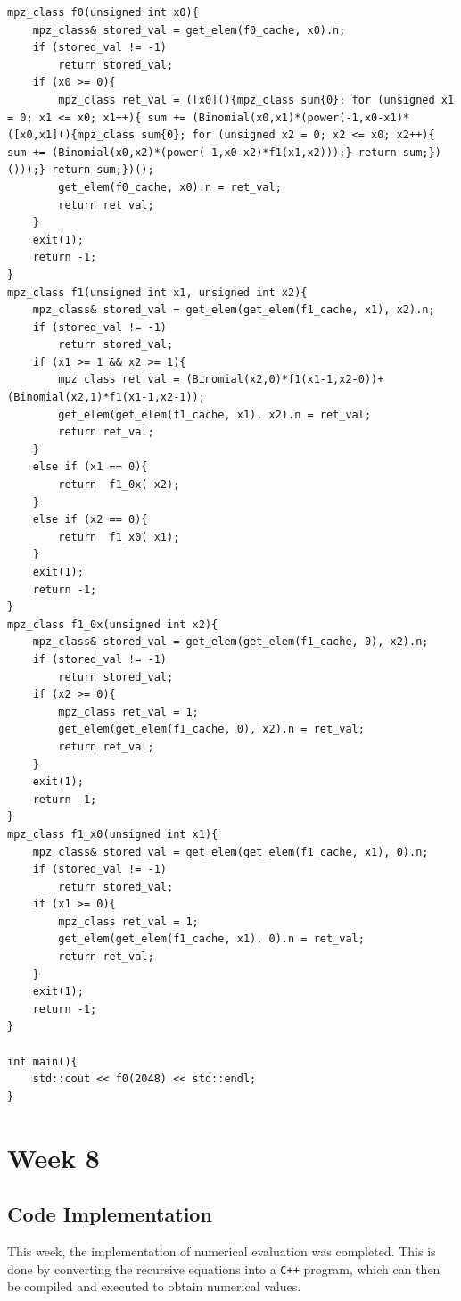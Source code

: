 \documentclass[12pt]{report}
\begin{document}
\begin{verbatim}
mpz_class f0(unsigned int x0){
	mpz_class& stored_val = get_elem(f0_cache, x0).n;
	if (stored_val != -1)
		return stored_val;
	if (x0 >= 0){
		mpz_class ret_val = ([x0](){mpz_class sum{0}; for (unsigned x1 = 0; x1 <= x0; x1++){ sum += (Binomial(x0,x1)*(power(-1,x0-x1)*([x0,x1](){mpz_class sum{0}; for (unsigned x2 = 0; x2 <= x0; x2++){ sum += (Binomial(x0,x2)*(power(-1,x0-x2)*f1(x1,x2)));} return sum;})()));} return sum;})();
		get_elem(f0_cache, x0).n = ret_val;
		return ret_val;
	}
	exit(1);
	return -1;
}
mpz_class f1(unsigned int x1, unsigned int x2){
	mpz_class& stored_val = get_elem(get_elem(f1_cache, x1), x2).n;
	if (stored_val != -1)
		return stored_val;
	if (x1 >= 1 && x2 >= 1){
		mpz_class ret_val = (Binomial(x2,0)*f1(x1-1,x2-0))+(Binomial(x2,1)*f1(x1-1,x2-1));
		get_elem(get_elem(f1_cache, x1), x2).n = ret_val;
		return ret_val;
	}
	else if (x1 == 0){
		return  f1_0x( x2);
	}
	else if (x2 == 0){
		return  f1_x0( x1);
	}
	exit(1);
	return -1;
}
mpz_class f1_0x(unsigned int x2){
	mpz_class& stored_val = get_elem(get_elem(f1_cache, 0), x2).n;
	if (stored_val != -1)
		return stored_val;
	if (x2 >= 0){
		mpz_class ret_val = 1;
		get_elem(get_elem(f1_cache, 0), x2).n = ret_val;
		return ret_val;
	}
	exit(1);
	return -1;
}
mpz_class f1_x0(unsigned int x1){
	mpz_class& stored_val = get_elem(get_elem(f1_cache, x1), 0).n;
	if (stored_val != -1)
		return stored_val;
	if (x1 >= 0){
		mpz_class ret_val = 1;
		get_elem(get_elem(f1_cache, x1), 0).n = ret_val;
		return ret_val;
	}
	exit(1);
	return -1;
}

int main(){
	std::cout << f0(2048) << std::endl;
}
    \end{verbatim}
    \chapter*{Week 8}
    \section*{Code Implementation}
    This week, the implementation of numerical evaluation was completed. This is done by converting the recursive equations into a \texttt{C++} program, which can then be compiled and executed to obtain numerical values. 
\end{document}
